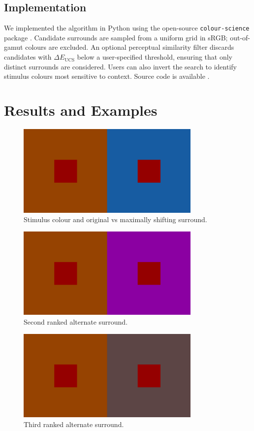 \documentclass[11pt]{article}
\begin{document}
\subsection{Implementation}
We implemented the algorithm in Python using the open-source \texttt{colour-science} package \parencite{colour-science}. Candidate surrounds are sampled from a uniform grid in sRGB; out-of-gamut colours are excluded. An optional perceptual similarity filter discards candidates with $\Delta E_{\mathrm{UCS}}$ below a user-specified threshold, ensuring that only distinct surrounds are considered. Users can also invert the search to identify stimulus colours most sensitive to context. Source code is available \parencite{colourshift}.

\section{Results and Examples}
\begin{figure}[h!]
\centering
\includegraphics[width=0.8\textwidth]{1.png}
\caption{Stimulus colour and original vs maximally shifting surround.}
\end{figure}

\begin{figure}[h!]
\centering
\includegraphics[width=0.8\textwidth]{2.png}
\caption{Second ranked alternate surround.}
\end{figure}

\begin{figure}[h!]
\centering
\includegraphics[width=0.8\textwidth]{3.png}
\caption{Third ranked alternate surround.}
\end{figure}
\end{document}
